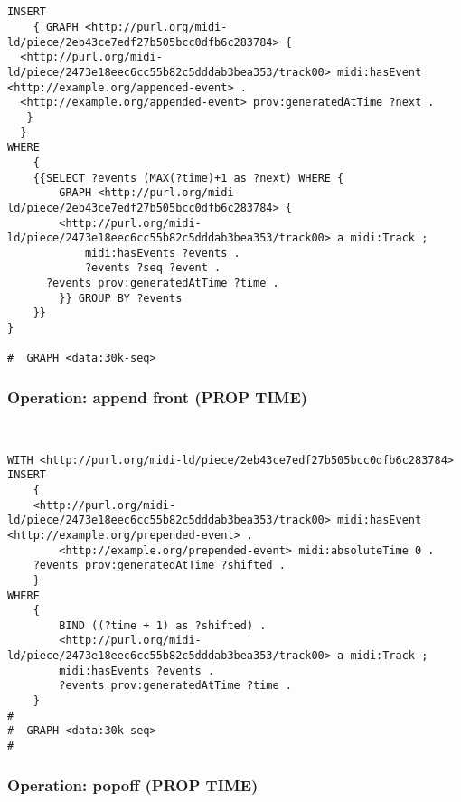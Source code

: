 \begin{lstlisting}[language=sparql]


INSERT
	{ GRAPH <http://purl.org/midi-ld/piece/2eb43ce7edf27b505bcc0dfb6c283784> {
  <http://purl.org/midi-ld/piece/2473e18eec6cc55b82c5dddab3bea353/track00> midi:hasEvent <http://example.org/appended-event> .
  <http://example.org/appended-event> prov:generatedAtTime ?next .
   }
  }
WHERE
	{
	{{SELECT ?events (MAX(?time)+1 as ?next) WHERE {
		GRAPH <http://purl.org/midi-ld/piece/2eb43ce7edf27b505bcc0dfb6c283784> {
		<http://purl.org/midi-ld/piece/2473e18eec6cc55b82c5dddab3bea353/track00> a midi:Track ;
			midi:hasEvents ?events .
			?events ?seq ?event .
      ?events prov:generatedAtTime ?time .
		}} GROUP BY ?events
	}}
}

#  GRAPH <data:30k-seq>

\end{lstlisting}

\subsubsection{Operation: append front (PROP TIME)}
\label{query:PROP\-TIME:append_front}

\begin{lstlisting}[language=sparql]


WITH <http://purl.org/midi-ld/piece/2eb43ce7edf27b505bcc0dfb6c283784>
INSERT
	{
    <http://purl.org/midi-ld/piece/2473e18eec6cc55b82c5dddab3bea353/track00> midi:hasEvent <http://example.org/prepended-event> .
		<http://example.org/prepended-event> midi:absoluteTime 0 .
    ?events prov:generatedAtTime ?shifted .
	}
WHERE
	{
		BIND ((?time + 1) as ?shifted) .
		<http://purl.org/midi-ld/piece/2473e18eec6cc55b82c5dddab3bea353/track00> a midi:Track ;
		midi:hasEvents ?events .
		?events prov:generatedAtTime ?time .
	}
#
#  GRAPH <data:30k-seq>
#

\end{lstlisting}

\subsubsection{Operation: popoff (PROP TIME)}
\label{query:PROP\-TIME:popoff}

